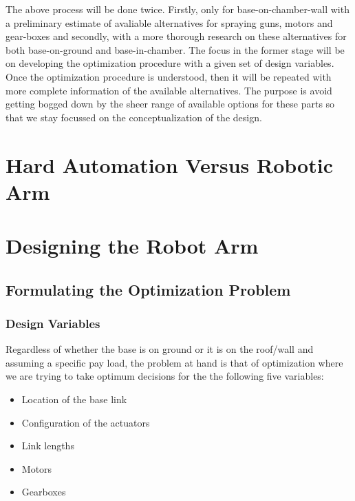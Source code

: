\documentclass[a4paper,10pt]{article}
\begin{document}
The above process will be done twice. Firstly, only for base-on-chamber-wall with a preliminary estimate of avaliable alternatives for spraying guns, motors and gear-boxes and secondly, with a more thorough
research on these alternatives for both base-on-ground and base-in-chamber. The focus in the former stage will be on developing the optimization procedure with a given set of design variables. Once the optimization
procedure is understood, then it will be repeated with more complete information of the available alternatives. The purpose is avoid getting bogged down by the sheer range of available options for these parts so that we stay focussed on the conceptualization of the design.


\section{Hard Automation Versus Robotic Arm}

\section{Designing the Robot Arm}

\subsection{Formulating the Optimization Problem}
\subsubsection{Design Variables}
Regardless of whether the base is on ground or it is on the roof/wall and assuming a specific pay load, the problem at hand
is that of optimization where we are trying to take optimum decisions for the the following five variables:
\begin{itemize}
  \item Location of the base link
  \item Configuration of the actuators
  \item Link lengths
  \item Motors
  \item Gearboxes
\end{itemize}
\end{document}
